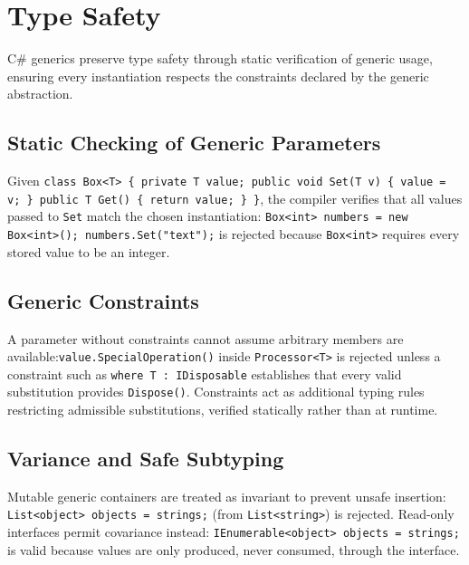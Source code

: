 \documentclass[11pt]{report}
\begin{document}

\section{Type Safety}
\label{CSharpGenerics:TypeSafety}

C\# generics preserve type safety through static verification of generic
usage, ensuring every instantiation respects the constraints declared by
the generic abstraction.

\subsection{Static Checking of Generic Parameters}
\label{CSharpGenerics:TypeSafety:StaticChecking}

Given \texttt{class Box<T> \{ private T value; public void Set(T v) \{
value = v; \} public T Get() \{ return value; \} \}}, the compiler
verifies that all values passed to \texttt{Set} match the chosen
instantiation: \texttt{Box<int> numbers = new Box<int>();
numbers.Set("text");} is rejected because \texttt{Box<int>} requires
every stored value to be an integer.

\subsection{Generic Constraints}

A parameter without constraints cannot assume arbitrary members are
available:\newline \texttt{value.SpecialOperation()} inside
\texttt{Processor<T>} is rejected unless a constraint such as
\texttt{where T : IDisposable} establishes that every valid substitution
provides \texttt{Dispose()}. Constraints act as additional typing rules
restricting admissible substitutions, verified statically rather than at
runtime.

\subsection{Variance and Safe Subtyping}

Mutable generic containers are treated as invariant to prevent unsafe
insertion: \texttt{List<object> objects = strings;} (from
\texttt{List<string>}) is rejected. Read-only interfaces permit covariance
instead: \texttt{IEnumerable<object> objects = strings;} is valid because
values are only produced, never consumed, through the interface.
\end{document}
